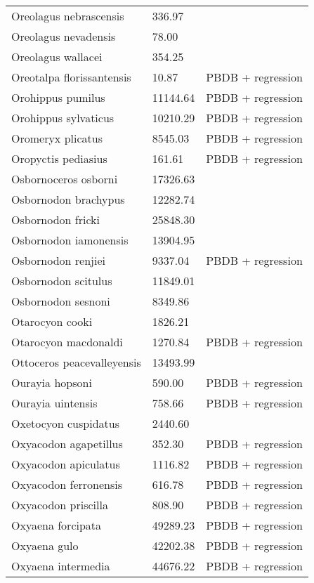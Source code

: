\begin{center}
\begin{longtable}{p{} p{} p{} }
  Oreolagus nebrascensis & 336.97 & \cite{Tomiya2013} \\ 
  Oreolagus nevadensis & 78.00 & \cite{McKenna2011} \\ 
  Oreolagus wallacei & 354.25 & \cite{Tomiya2013} \\ 
  Oreotalpa florissantensis & 10.87 & PBDB + regression \\ 
  Orohippus pumilus & 11144.64 & PBDB + regression \\ 
  Orohippus sylvaticus & 10210.29 & PBDB + regression \\ 
  Oromeryx plicatus & 8545.03 & PBDB + regression \\ 
  Oropyctis pediasius & 161.61 & PBDB + regression \\ 
  Osbornoceros osborni & 17326.63 & \cite{Tomiya2013} \\ 
  Osbornodon brachypus & 12282.74 & \cite{Chester2012} \\ 
  Osbornodon fricki & 25848.30 & \cite{Tomiya2013} \\ 
  Osbornodon iamonensis & 13904.95 & \cite{Tomiya2013} \\ 
  Osbornodon renjiei & 9337.04 & PBDB + regression \\ 
  Osbornodon scitulus & 11849.01 & \cite{Tomiya2013} \\ 
  Osbornodon sesnoni & 8349.86 & \cite{Tomiya2013} \\ 
  Otarocyon cooki & 1826.21 & \cite{Tomiya2013} \\ 
  Otarocyon macdonaldi & 1270.84 & PBDB + regression \\ 
  Ottoceros peacevalleyensis & 13493.99 & \cite{Tomiya2013} \\ 
  Ourayia hopsoni & 590.00 & PBDB + regression \\ 
  Ourayia uintensis & 758.66 & PBDB + regression \\ 
  Oxetocyon cuspidatus & 2440.60 & \cite{Tomiya2013} \\ 
  Oxyacodon agapetillus & 352.30 & PBDB + regression \\ 
  Oxyacodon apiculatus & 1116.82 & PBDB + regression \\ 
  Oxyacodon ferronensis & 616.78 & PBDB + regression \\ 
  Oxyacodon priscilla & 808.90 & PBDB + regression \\ 
  Oxyaena forcipata & 49289.23 & PBDB + regression \\ 
  Oxyaena gulo & 42202.38 & PBDB + regression \\ 
  Oxyaena intermedia & 44676.22 & PBDB + regression \\ 

\end{longtable}
\end{center}
